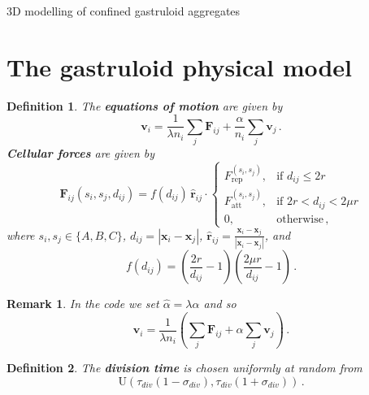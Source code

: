 \documentclass{article}
\newtheorem{definition}{Definition}
\newtheorem{remark}{Remark}
\begin{document}
{\huge\centering 3D modelling of confined gastruloid aggregates\par}

\tableofcontents

\vspace{1em}

\section{The gastruloid physical model}

\begin{definition}
    The \textbf{equations of motion} are given by
    \begin{equation*}
        {\mathbf{v}}_i = \frac{1}{{\lambda} n_i} \sum_j {\mathbf{F}}_{ij} + \frac{\alpha}{n_i} \sum_j {\mathbf{v}}_j \,.
    \end{equation*}
    \textbf{Cellular forces} are given by
    \begin{equation*}
        \mathbf{F}_{ij}(s_i, s_j, d_{ij}) = f(d_{ij})\, \hat{\mathbf{r}}_{ij} \cdot
        \begin{cases}
            F_\text{rep}^{(s_i, s_j)}, & \text{if } d_{ij} \leq 2r \\
            F_\text{att}^{(s_i, s_j)}, & \text{if } 2r < d_{ij} < 2\mu r \\
            0, & \text{otherwise} \,,
        \end{cases}
    \end{equation*}
    where $s_i,s_j \in\{A,B,C\}$, 
    ${d}_{ij} = {|\mathbf{x}_i - \mathbf{x}_j|}$,
    $\hat{\mathbf{r}}_{ij} = \frac{\mathbf{x}_i - \mathbf{x}_j}{|\mathbf{x}_i - \mathbf{x}_j|}$, 
    and 
    $$f(d_{ij}) = \left(\frac{2r}{d_{ij}} - 1\right)\left(\frac{2\mu r}{d_{ij}} - 1\right) \,.$$
\end{definition}

\begin{remark}
    In the code we set $\hat\alpha=\lambda\alpha$ and so
    \begin{equation*}
        {\mathbf{v}}_i = \frac{1}{{\lambda} n_i}\left( \sum_j {\mathbf{F}}_{ij} + \alpha \sum_j {\mathbf{v}}_j \right) \,.
    \end{equation*}
\end{remark}

\begin{definition}
    The \textbf{division time} is chosen uniformly at random from
    \begin{equation*}
        \text{U}\left(\tau_{div}(1-\sigma_{div}),\tau_{div}(1+\sigma_{div})\right) \,.
    \end{equation*}
\end{definition}
\end{document}
